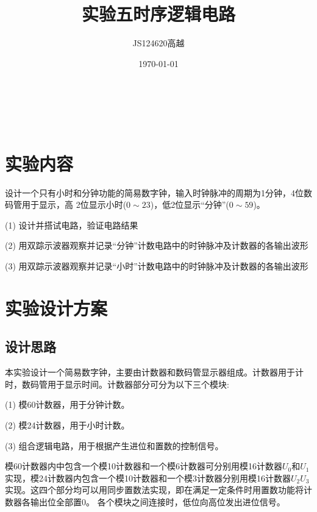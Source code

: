 \documentclass[zihao=-4]{ctexart} %
\title{实验五\quad 时序逻辑电路}
\author{JS124620\quad 高越}
\date{\today} %
\makeatletter
\renewcommand{\maketitle}{
    \begin{center}
        {\zihao{2}\CJKfontspec[FakeBold=3]{SimSun} \@title} \\[0.75em] %
        {\zihao{-4} \@author} \\[0.5em] %
        {\zihao{-4} \@date} %
    \end{center}
}
\makeatother
\begin{document}
\maketitle %

\section{实验内容} %
设计一个只有小时和分钟功能的简易数字钟，输入时钟脉冲的周期为1分钟，4位数码管用于显示，高
2位显示小时($0\sim 23$)，低2位显示“分钟”($0\sim 59$)。

(1) 设计并搭试电路，验证电路结果

(2) 用双踪示波器观察并记录“分钟”计数电路中的时钟脉冲及计数器的各输出波形

(3) 用双踪示波器观察并记录“小时”计数电路中的时钟脉冲及计数器的各输出波形
\section{实验设计方案}
\subsection{设计思路}
本实验设计一个简易数字钟，主要由计数器和数码管显示器组成。计数器用于计时，数码管用于显示时间。计数器部分可分为以下三个模块:

    (1) 模60计数器，用于分钟计数。

    (2) 模24计数器，用于小时计数。

    (3) 组合逻辑电路，用于根据产生进位和置数的控制信号。

模60计数器内中包含一个模10计数器和一个模6计数器可分别用模16计数器$U_0$和$U_1$实现，模24计数器内包含一个模10计数器和一个模3计数器分别用模16计数器$U_2$$U_3$实现。这四个部分均可以用同步置数法实现，即在满足一定条件时用置数功能将计数器各输出位全部置0。
各个模块之间连接时，低位向高位发出进位信号。
\end{document}
